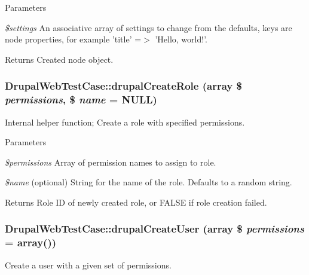 \begin{DoxyParams}{Parameters}
\item[{\em \$settings}]An associative array of settings to change from the defaults, keys are node properties, for example 'title' =$>$ 'Hello, world!'. \end{DoxyParams}
\begin{DoxyReturn}{Returns}
Created node object. 
\end{DoxyReturn}
\hypertarget{classDrupalWebTestCase_ac704af37ef0e0d824af1407265bf750d}{
\subsubsection[{drupalCreateRole}]{\setlength{\rightskip}{0pt plus 5cm}DrupalWebTestCase::drupalCreateRole (array \$ {\em permissions}, \/  \$ {\em name} = {\ttfamily NULL})}}
\label{classDrupalWebTestCase_ac704af37ef0e0d824af1407265bf750d}
Internal helper function; Create a role with specified permissions.


\begin{DoxyParams}{Parameters}
\item[{\em \$permissions}]Array of permission names to assign to role. \item[{\em \$name}](optional) String for the name of the role. Defaults to a random string. \end{DoxyParams}
\begin{DoxyReturn}{Returns}
Role ID of newly created role, or FALSE if role creation failed. 
\end{DoxyReturn}
\hypertarget{classDrupalWebTestCase_acc3d96e30db573b45744aef79af11862}{
\subsubsection[{drupalCreateUser}]{\setlength{\rightskip}{0pt plus 5cm}DrupalWebTestCase::drupalCreateUser (array \$ {\em permissions} = {\ttfamily array()})}}
\label{classDrupalWebTestCase_acc3d96e30db573b45744aef79af11862}
Create a user with a given set of permissions.


